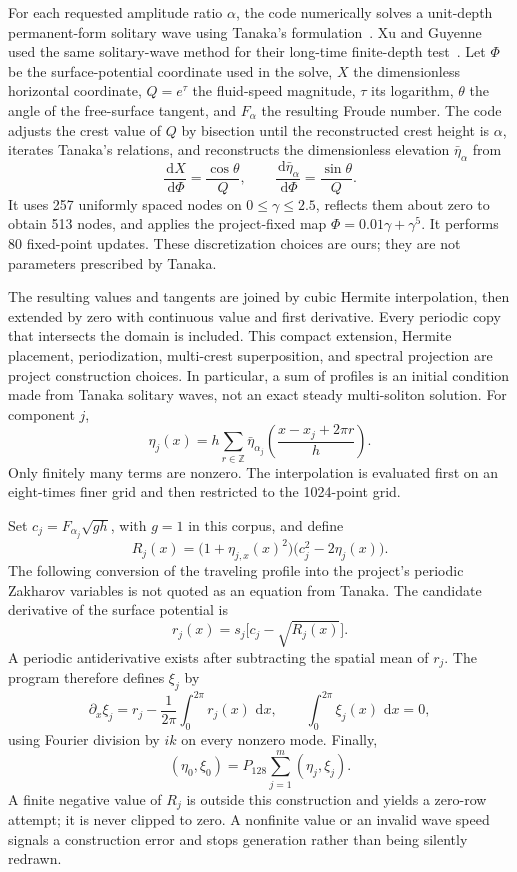\documentclass[10pt]{article}
\newcommand{\dd}{\,\mathrm d}
\begin{document}
For each requested amplitude ratio $\alpha$, the code numerically solves a
unit-depth permanent-form solitary wave using Tanaka's
formulation~\cite{tanaka1986}.  Xu and Guyenne used the same solitary-wave method for
their long-time finite-depth test~\cite{xu2009}.  Let $\Phi$ be the
surface-potential coordinate used in the solve, $X$ the dimensionless
horizontal coordinate, $Q=e^\tau$ the fluid-speed magnitude, $\tau$ its
logarithm, $\theta$ the angle of the free-surface tangent, and $F_\alpha$ the
resulting Froude number.  The code adjusts the crest value of $Q$ by bisection
until the reconstructed crest height is $\alpha$, iterates Tanaka's
relations, and reconstructs the dimensionless elevation
$\bar\eta_\alpha$ from
\[
  \frac{\dd X}{\dd\Phi}=\frac{\cos\theta}{Q},
  \qquad
  \frac{\dd\bar\eta_\alpha}{\dd\Phi}
  =\frac{\sin\theta}{Q}.
\]
It uses 257 uniformly spaced nodes on \(0\leq\gamma\leq2.5\), reflects them
about zero to obtain 513 nodes, and applies the project-fixed map
\(\Phi=0.01\gamma+\gamma^5\).  It performs 80 fixed-point updates.  These
discretization choices are ours; they are not parameters prescribed by
Tanaka.

The resulting values and tangents are joined by cubic Hermite interpolation,
then extended by zero with continuous value and first derivative.  Every
periodic copy that intersects the domain is included.  This compact
extension, Hermite placement, periodization, multi-crest superposition, and
spectral projection are project construction choices.  In particular, a sum
of profiles is an initial condition made from Tanaka solitary waves, not an
exact steady multi-soliton solution.
For component $j$,
\begin{equation}
  \eta_j(x)
  =
  h\sum_{r\in\mathbb Z}
  \bar\eta_{\alpha_j}
  \!\left(\frac{x-x_j+2\pi r}{h}\right).
  \label{eq:tanaka-elevation}
\end{equation}
Only finitely many terms are nonzero.  The interpolation is evaluated first
on an eight-times finer grid and then restricted to the 1024-point grid.

Set $c_j=F_{\alpha_j}\sqrt{gh}$, with $g=1$ in this corpus, and define
\begin{equation}
  R_j(x)
  =
  \bigl(1+\eta_{j,x}(x)^2\bigr)
  \bigl(c_j^2-2\eta_j(x)\bigr).
  \label{eq:tanaka-radicand}
\end{equation}
The following conversion of the traveling profile into the project's
periodic Zakharov variables is not quoted as an equation from Tanaka.  The
candidate derivative of the surface potential is
\[
  r_j(x)=s_j\bigl[c_j-\sqrt{R_j(x)}\bigr].
\]
A periodic antiderivative exists after subtracting the spatial mean of
$r_j$.  The program therefore defines $\xi_j$ by
\[
  \partial_x\xi_j=r_j-\frac1{2\pi}\int_0^{2\pi}r_j(x)\,\dd x,
  \qquad
  \int_0^{2\pi}\xi_j(x)\,\dd x=0,
\]
using Fourier division by $ik$ on every nonzero mode.  Finally,
\[
  (\eta_0,\xi_0)
  =
  P_{128}\sum_{j=1}^{m}(\eta_j,\xi_j).
\]
A finite negative value of $R_j$ is outside this construction and yields a
zero-row attempt; it is never clipped to zero.  A nonfinite value or an
invalid wave speed signals a construction error and stops generation rather
than being silently redrawn.
\end{document}
